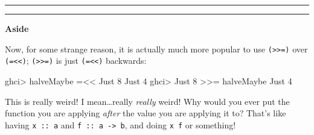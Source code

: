 \documentclass[]{article}
\newenvironment{Shaded}{}{}
\newcommand{\DataTypeTok}[1]{\textcolor[rgb]{0.56,0.13,0.00}{#1}}
\newcommand{\DecValTok}[1]{\textcolor[rgb]{0.25,0.63,0.44}{#1}}
\newcommand{\NormalTok}[1]{#1}
\newcommand{\OperatorTok}[1]{\textcolor[rgb]{0.40,0.40,0.40}{#1}}
\begin{document}
\begin{center}\rule{0.5\linewidth}{0.5pt}\end{center}

\begin{center}\rule{0.5\linewidth}{0.5pt}\end{center}

\textbf{Aside}

Now, for some strange reason, it is actually much more popular to use
\texttt{(\textgreater{}\textgreater{}=)} over
\texttt{(=\textless{}\textless{})}; \texttt{(\textgreater{}\textgreater{}=)} is
just \texttt{(=\textless{}\textless{})} backwards:

\begin{Shaded}
\begin{Highlighting}[]
\NormalTok{ghci}\OperatorTok{\textgreater{}}\NormalTok{ halveMaybe }\OperatorTok{=\textless{}\textless{}} \DataTypeTok{Just} \DecValTok{8}
\DataTypeTok{Just} \DecValTok{4}
\NormalTok{ghci}\OperatorTok{\textgreater{}} \DataTypeTok{Just} \DecValTok{8} \OperatorTok{\textgreater{}\textgreater{}=}\NormalTok{ halveMaybe}
\DataTypeTok{Just} \DecValTok{4}
\end{Highlighting}
\end{Shaded}

This is really weird! I mean\ldots really \emph{really} weird! Why would you
ever put the function you are applying \emph{after} the value you are applying
it to? That's like having \texttt{x\ ::\ a} and
\texttt{f\ ::\ a\ -\textgreater{}\ b}, and doing \texttt{x\ f} or something!
\end{document}
